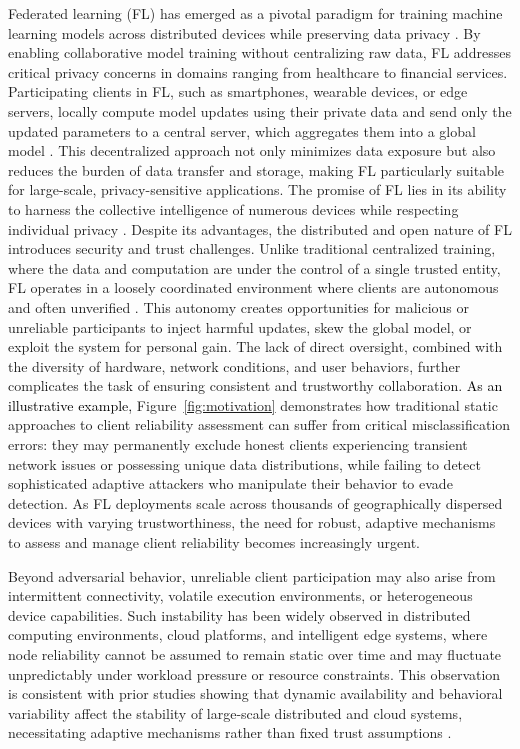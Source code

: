 \documentclass[lettersize,journal]{IEEEtran}
\newcommand{\Acolor}[1]{\textcolor{black}{#1}}
\begin{document}
Federated learning (FL) has emerged as a pivotal paradigm for training machine learning models across distributed devices while preserving data privacy \cite{guo2025reputation,shi2025fedmar,8832210,YOUNESI2026101815}. By enabling collaborative model training without centralizing raw data, FL addresses critical privacy concerns in domains ranging from healthcare to financial services. Participating clients in FL, such as smartphones, wearable devices, or edge servers, locally compute model updates using their private data and send only the updated parameters to a central server, which aggregates them into a global model \cite{pmlr-v54-mcmahan17a}. This decentralized approach not only minimizes data exposure but also reduces the burden of data transfer and storage, making FL particularly suitable for large-scale, privacy-sensitive applications. The promise of FL lies in its ability to harness the collective intelligence of numerous devices while respecting individual privacy \cite{li2020federated,kairouz2021advancesopenproblemsfederated,younesi2024cnn}.
Despite its advantages, the distributed and open nature of FL introduces security and trust challenges. Unlike traditional centralized training, where the data and computation are under the control of a single trusted entity, FL operates in a loosely coordinated environment where clients are autonomous and often unverified \cite{lyu2020threats,bagdasaryan2020backdoor}. This autonomy creates opportunities for malicious or unreliable participants to inject harmful updates, skew the global model, or exploit the system for personal gain. The lack of direct oversight, combined with the diversity of hardware, network conditions, and user behaviors, further complicates the task of ensuring consistent and trustworthy collaboration.
\Acolor{As an illustrative example,} Figure~\ref{fig:motivation} demonstrates how traditional static approaches to client reliability assessment can suffer from critical misclassification errors: they may permanently exclude honest clients experiencing transient network issues or possessing unique data distributions, while failing to detect sophisticated adaptive attackers who manipulate their behavior to evade detection. As FL deployments scale across thousands of geographically dispersed devices with varying trustworthiness, the need for robust, adaptive mechanisms to assess and manage client reliability becomes increasingly urgent.

Beyond adversarial behavior, unreliable client participation may also arise from intermittent connectivity, volatile execution environments, or heterogeneous device capabilities. Such instability has been widely observed in distributed computing environments, cloud platforms, and intelligent edge systems, where node reliability cannot be assumed to remain static over time and may fluctuate unpredictably under workload pressure or resource constraints. This observation is consistent with prior studies showing that dynamic availability and behavioral variability affect the stability of large-scale distributed and cloud systems, necessitating adaptive mechanisms rather than fixed trust assumptions \cite{8457785,9090348}.
\end{document}
